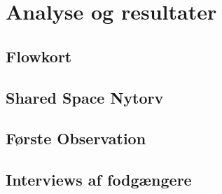 \chapter{Analyse og resultater}
\label{chap:Analyse og resultater}

\section{Flowkort}
\label{sec:Flowkort}

\section{Shared Space Nytorv}
\label{sec:Shared Space Nytorv}

\section{Første Observation}
\label{sec:Første Observation}

\section{Interviews af fodgængere}
\label{sec:Interviews af fodgængere}
